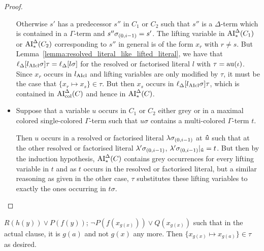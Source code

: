 \documentclass[,%
	draft=false,%
	numbers=noendperiod
	11pt,
	a4paper,
	oneside,%
	openany,
]{memoir}
\begin{document}
\begin{proof}
\begin{itemize}
			Otherwise $s'$ has a predecessor $s''$ in $C_1$ or $C_2$ such that $s''$ is a $\Delta$-term which is contained in a $\Gamma$-term and $s''\sigma_{(0,i-1)} = s'$.
			The lifting variable in $\operatorname{AI}_\mathrm{*}^\Delta(C_1)$ or $\operatorname{AI}_\mathrm{*}^\Delta(C_2)$ corresponding to $s''$ in general is of the form $x_r$ with $r\neq s$.
			But Lemma~\ref{lemma:resolved_literal_like_lifted_literal}, we have that $\ell_{\Delta}[l_{\operatorname{AIcl}}\sigma]\tau = \ell_{\Delta}[l\sigma]$ for the resolved or factorised literal $l$ with $\tau = \operatorname{au}(\iota)$.
			Since $x_r$ occurs in $l_{\operatorname{AIcl}}$ and lifting variables are only modified by $\tau$, it must be the case that $\{x_r \mapsto x_s\}\in \tau$.
			But then $x_s$ occurs in $\ell_{\Delta}[l_{\operatorname{AIcl}}\sigma]\tau$, which is contained in $\operatorname{AI}_\mathrm{col}^\Delta(C)$ and hence in $\operatorname{AI}_\mathrm{*}^\Delta(C)$.


		\item
			Suppose that a variable $u$ occurs in $C_1$ or $C_2$ either grey or in a maximal colored single-colored $\Gamma$-term such that $u\sigma$ contains a multi-colored $\Gamma$-term $t$.

			Then $u$ occurs in a resolved or factorised literal $\lambda\sigma_{(0,i-1)}$ at $\bm\hat u$ such that at the other resolved or factorised literal $\lambda'\sigma_{(0,i-1)}$, $\lambda'\sigma_{(0,i-1)}|_{\bm\hat u} = t$.
			But then by the induction hypothesis, $\operatorname{AI}_\mathrm{*}^\Delta(C)$ contains grey occurrences for every lifting variable in $t$ and as $t$ occurs in the resolved or factorised literal, but a similar reasoning as given in the other case, $\tau$ substitutes these lifting variables to exactly the ones occurring in $t\sigma$.
			\qedhere
	\end{itemize}


\end{proof}

\begin{exa}
	$ R(h(y)) \lor P(f(y))$;
	$ \lnot P(f(x_{g(x)})) \lor Q(x_{g(x)}) $ such that in the actual clause, it is $g(a)$ and not $g(x)$ any more.
	Then $ \{ x_{g(x)} \mapsto x_{g(a)} \} \in \tau $ as desired.
\end{exa}
\end{document}
